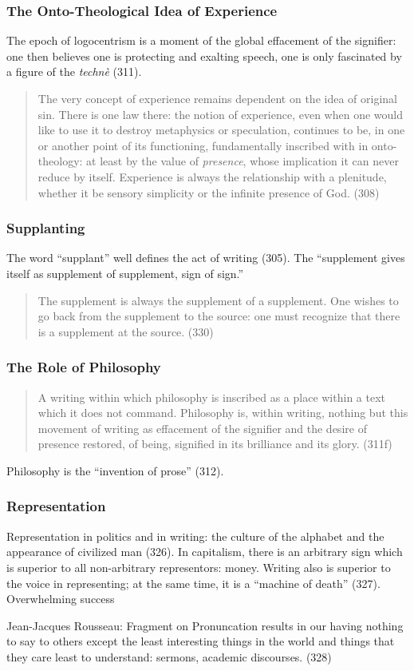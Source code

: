 \documentclass[xcolor=dvipsnames]{beamer}
\begin{document}
\begin{frame}
  \frametitle{The Onto-Theological Idea of Experience}
      The epoch of logocentrism is a moment of the global effacement
      of the signifier: one then believes one is protecting and
      exalting speech, one is only fascinated by a figure of the
      \emph{techn{\`e}} (311).
  \begin{quote}
    The very concept of experience remains dependent on the
    idea of original sin. There is one law there: the notion of
    experience, even when one would like to use it to destroy
    metaphysics or speculation, continues to be, in one or another
    point of its functioning, fundamentally inscribed with in onto-theology:
    at least by the value of \emph{presence}, whose implication
    it can never reduce by itself. Experience is always the
    relationship with a plenitude, whether it be sensory simplicity
    or the infinite presence of God. (308)
  \end{quote}
\end{frame}

\begin{frame}
  \frametitle{Supplanting}
  The word ``supplant'' well defines the act of writing (305). The
  ``supplement gives itself as supplement of supplement, sign of
  sign.'' 
  \begin{quote}
    The supplement is always the supplement of a supplement. One
    wishes to go back from the supplement to the source: one must
    recognize that there is a supplement at the source. (330)
  \end{quote}
\end{frame}

\begin{frame}
  \frametitle{The Role of Philosophy}
  \begin{quote}
    A writing within which philosophy is inscribed as a place within
    a text which it does not command. Philosophy is, within writing,
    nothing but this movement of writing as effacement of the
    signifier and the desire of presence restored, of being, signified
    in its brilliance and its glory. (311f)
  \end{quote}
  Philosophy is the ``invention of prose'' (312). 
\end{frame}

\begin{frame}
  \frametitle{Representation}
  Representation in politics and in writing: the culture of the
  alphabet and the appearance of civilized man (326). In capitalism,
  there is an arbitrary sign which is superior to all non-arbitrary
  representors: money. Writing also is superior to the voice in
  representing; at the same time, it is a ``machine of death'' (327).
  Overwhelming success 
  \begin{block}{Jean-Jacques Rousseau: Fragment on Pronuncation}
    results in our having nothing to say to others except the least
    interesting things in the world and things that they care least to
    understand: sermons, academic discourses. (328)
  \end{block}
\end{frame}
\end{document}
